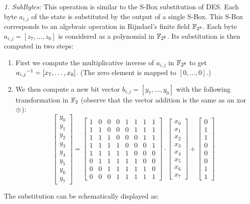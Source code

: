 \textit{1. SubBytes:}   This operation is similar to the S-Box
substitution of DES. Each byte $a_{i,j}$ of the state is substituted by the
output of a single S-Box.  This S-Box corresponds to an algebraic operation in
Rijndael's finite field ${ \mathbb{F}_{2^8}}$. Each byte $a_{i,j}=[z_7,\ldots,z_0]$ is
considered as a polynomial in ${ \mathbb{F}_{2^8}}$. Its substitution is then computed in
two steps:
\begin{enumerate}
\item First we compute the multiplicative inverse of $a_{i,j}$ in ${ \mathbb{F}_{2^8}}$
  to get ${{a_{i,j}}^{-1}}=[x_7,\ldots, x_0]$. (The zero element is mapped to
  $[0,\ldots,0]$.)
\item We then compute a new bit vector $b_{i,j}=[y_7,\ldots,y_0]$ with the
  following transformation in $\mathbb{F}_2$ (observe that the vector addition is the
  same as an xor ${\oplus}$):
  \[\begin{bmatrix}y_0\\y_1\\y_2\\y_3\\y_4\\y_5\\y_6\\y_7\end{bmatrix} =
  \begin{bmatrix} 1&0&0&0&1&1&1&1 \\ 1&1&0&0&0&1&1&1 \\ 1&1&1&0&0&0&1&1 \\ 
    1&1&1&1&0&0&0&1 \\ 1&1&1&1&1&0&0&0 \\ 0&1&1&1&1&1&0&0 \\ 0&0&1&1&1&1&1&0 \\ 
    0&0&0&1&1&1&1&1\end{bmatrix}\cdot
  \begin{bmatrix}x_0\\x_1\\x_2\\x_3\\x_4\\x_5\\x_6\\x_7\end{bmatrix} +
  \begin{bmatrix}0\\1\\1\\0\\0\\0\\1\\1\end{bmatrix} \]
\end{enumerate}
The substitution can be schematically displayed as:

